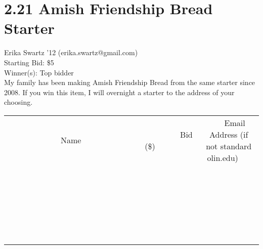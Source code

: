 \documentclass[11pt]{article}
\begin{document}
\section*{2.21 Amish Friendship Bread Starter}
Erika Swartz '12  (erika.swartz@gmail.com) \\
Starting Bid: \$5 \\
Winner(s): 
Top bidder \\
My family has been making Amish Friendship Bread from the same starter since 2008. If you win this item, I will overnight a starter to the address of your choosing. \\[6ex]
\begin{tabular}{c c c}
~~~~~~~~~~~~~Name~~~~~~~~~~~~~ & ~~~~~~~~~Bid (\$)~~~~~~~~~ & ~~~Email Address (if not standard olin.edu)~~~ \\
 & & \\
\hline
 & & \\
\hline
 & & \\
\hline
 & & \\
\hline
 & & \\
\hline
 & & \\
\hline
 & & \\
\hline
 & & \\
\hline
 & & \\
\hline
 & & \\
\hline
 & & \\
\hline
 & & \\
\hline
 & & \\
\hline
 & & \\
\hline
 & & \\
\hline
 & & \\
\hline
 & & \\
\hline
 & & \\
\hline
 & & \\
\hline
 & & \\
\hline
 & & \\
\hline
 & & \\
\hline
 & & \\
\hline
 & & \\
\hline
 & & \\
\hline
 & & \\
\hline
\end{tabular}
\clearpage
\end{document}
